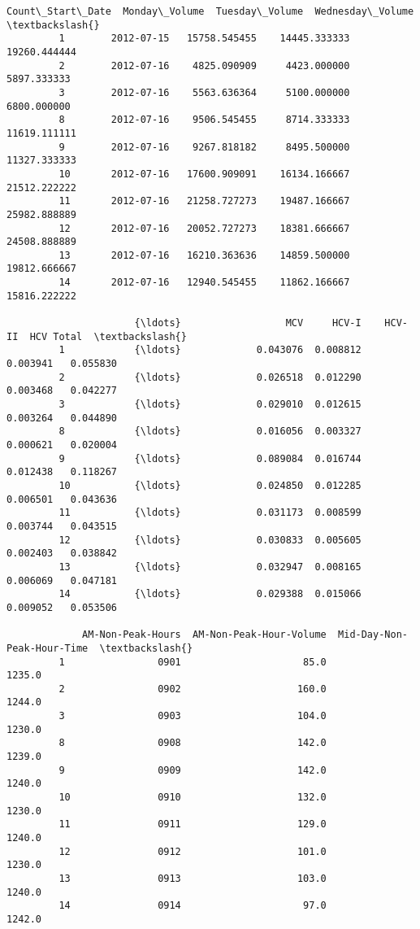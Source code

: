 \documentclass[11pt]{article}
\begin{document}
\begin{Verbatim}[commandchars=\\\{\}]
            Count\_Start\_Date  Monday\_Volume  Tuesday\_Volume  Wednesday\_Volume  \textbackslash{}
         1        2012-07-15   15758.545455    14445.333333      19260.444444   
         2        2012-07-16    4825.090909     4423.000000       5897.333333   
         3        2012-07-16    5563.636364     5100.000000       6800.000000   
         8        2012-07-16    9506.545455     8714.333333      11619.111111   
         9        2012-07-16    9267.818182     8495.500000      11327.333333   
         10       2012-07-16   17600.909091    16134.166667      21512.222222   
         11       2012-07-16   21258.727273    19487.166667      25982.888889   
         12       2012-07-16   20052.727273    18381.666667      24508.888889   
         13       2012-07-16   16210.363636    14859.500000      19812.666667   
         14       2012-07-16   12940.545455    11862.166667      15816.222222   
         
                      {\ldots}                  MCV     HCV-I    HCV-II  HCV Total  \textbackslash{}
         1            {\ldots}             0.043076  0.008812  0.003941   0.055830   
         2            {\ldots}             0.026518  0.012290  0.003468   0.042277   
         3            {\ldots}             0.029010  0.012615  0.003264   0.044890   
         8            {\ldots}             0.016056  0.003327  0.000621   0.020004   
         9            {\ldots}             0.089084  0.016744  0.012438   0.118267   
         10           {\ldots}             0.024850  0.012285  0.006501   0.043636   
         11           {\ldots}             0.031173  0.008599  0.003744   0.043515   
         12           {\ldots}             0.030833  0.005605  0.002403   0.038842   
         13           {\ldots}             0.032947  0.008165  0.006069   0.047181   
         14           {\ldots}             0.029388  0.015066  0.009052   0.053506   
         
             AM-Non-Peak-Hours  AM-Non-Peak-Hour-Volume  Mid-Day-Non-Peak-Hour-Time  \textbackslash{}
         1                0901                     85.0                      1235.0   
         2                0902                    160.0                      1244.0   
         3                0903                    104.0                      1230.0   
         8                0908                    142.0                      1239.0   
         9                0909                    142.0                      1240.0   
         10               0910                    132.0                      1230.0   
         11               0911                    129.0                      1240.0   
         12               0912                    101.0                      1230.0   
         13               0913                    103.0                      1240.0   
         14               0914                     97.0                      1242.0   
         

\end{Verbatim}
\end{document}

